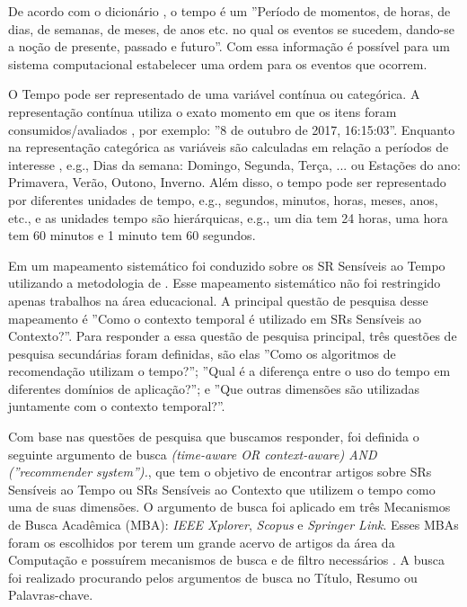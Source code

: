 De acordo com o dicionário , o tempo é um  ''Período de momentos, de horas, de dias,
de semanas, de meses, de anos etc. no qual os eventos se sucedem, dando-se a noção de presente, passado e futuro''.
Com essa informação é possível para um sistema computacional estabelecer uma ordem para os eventos que ocorrem.

O Tempo pode ser representado de uma variável contínua ou categórica. A representação contínua utiliza o exato momento
em que os itens foram consumidos/avaliados \cite{campos2014time}, por exemplo: ''8 de outubro de 2017, 16:15:03''.
Enquanto na representação categórica as variáveis são calculadas em relação a períodos de interesse \cite{campos2014time},
e.g., Dias da semana: {Domingo, Segunda, Terça, ...} ou Estações do ano: {Primavera, Verão, Outono, Inverno}. Além
disso, o tempo pode ser representado por diferentes unidades de tempo, e.g., segundos, minutos, horas, meses, anos,
etc., e as unidades tempo são hierárquicas, e.g., um dia tem 24 horas, uma hora tem 60 minutos e 1 minuto tem 60
segundos.

Em  um mapeamento sistemático foi conduzido sobre os SR Sensíveis ao Tempo utilizando a metodologia de
. Esse mapeamento sistemático não foi restringido apenas trabalhos na área
educacional. A principal questão de pesquisa desse mapeamento é ''Como o contexto temporal é utilizado em SRs
Sensíveis ao Contexto?''. Para responder a essa questão de pesquisa principal, três questões de pesquisa secundárias
foram definidas, são elas ''Como os algoritmos de recomendação utilizam o tempo?''; ''Qual é a diferença entre o uso
do tempo em diferentes domínios de aplicação?''; e ''Que outras dimensões são utilizadas juntamente com o contexto
temporal?''.

Com base nas questões de pesquisa que buscamos responder, foi definida o seguinte argumento de busca
\textit{(time-aware OR context-aware) AND (''recommender system'').}, que tem o objetivo de encontrar artigos sobre
SRs Sensíveis ao Tempo ou SRs Sensíveis ao Contexto que utilizem o tempo como uma de suas dimensões.
O argumento de busca foi aplicado em três Mecanismos de Busca Acadêmica (MBA): \textit{IEEE Xplorer}, \textit{Scopus} e
\textit{Springer Link}. Esses MBAs foram os escolhidos por terem um grande acervo
de artigos da área da Computação e possuírem mecanismos de busca e de filtro necessários \cite{de2017time}. A busca
foi realizado procurando pelos argumentos de busca no Título, Resumo ou Palavras-chave.

